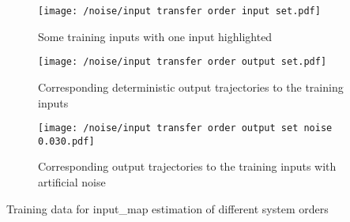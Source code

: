 \begin{example}
\begin{minipage}{1\textwidth}
\begingroup
	\centering
	\vspace{1em}
    \begin{subfigure}[t]{0.32\textwidth}
        \centering\captionsetup{width=.9\linewidth}
        \texttt{[image: /noise/input transfer order input set.pdf]}
        \caption{Some training inputs with one input highlighted}
        \label{subfig:input_tf_order_training_data_in_appex2}
    \end{subfigure}
    \hfill
    \begin{subfigure}[t]{0.32\textwidth}
        \centering\captionsetup{width=.9\linewidth}
        \texttt{[image: /noise/input transfer order output set.pdf]}
        \caption{Corresponding deterministic output trajectories to the training inputs}
        \label{subfig:input_tf_order_training_data_out_appex2}
    \end{subfigure}
    \hfill
    \begin{subfigure}[t]{0.32\textwidth}
        \centering\captionsetup{width=.9\linewidth}
        \texttt{[image: /noise/input transfer order output set noise 0.030.pdf]}
        \caption{Corresponding output trajectories to the training inputs with artificial noise}
        \label{subfig:input_tf_order_training_data_out2_appex2}
    \end{subfigure}
    \caption[System Order of Transfer Maps Example (Training Data)]{Training data for \gls*{input_map} estimation of different system orders}
    \label{fig:input_tf_order_training_data_appex2}
\endgroup
\end{minipage}
\end{example}  




